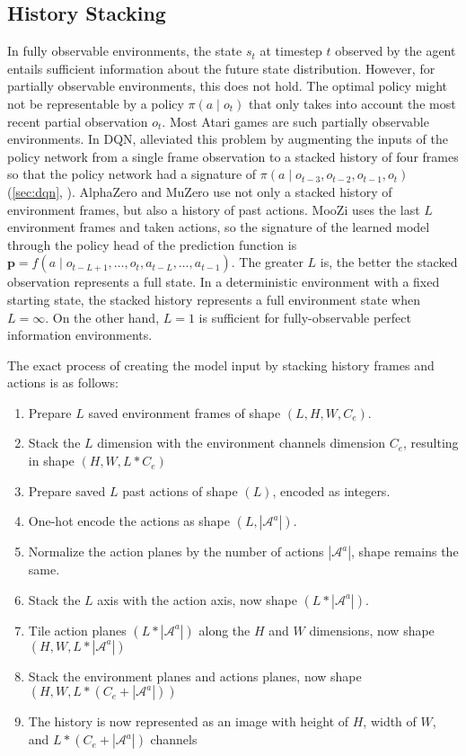 \subsection{History Stacking} \label{sec:history_stacking}
In fully observable environments, the state $s_t$ at timestep $t$ observed by the agent entails sufficient information about the future state distribution.
However, for partially observable environments, this does not hold.
The optimal policy might not be representable by a policy $\pi(a \mid o_t)$ that only takes into account the most recent partial observation $o_t$.
Most Atari games are such partially observable environments.
In DQN, \citeauthor{PlayingAtariDeep_Mnih.Kavukcuoglu.ea_2013} alleviated this problem by augmenting the inputs of the policy network from a single frame observation to a stacked history of four frames so that the policy network had a signature of $\pi(a \mid o_{t-3}, o_{t-2}, o_{t-1}, o_t)$ (\ref{sec:dqn}, \cite{PlayingAtariDeep_Mnih.Kavukcuoglu.ea_2013}).
AlphaZero and MuZero use not only a stacked history of environment frames, but also a history of past actions.
MooZi uses the last $L$ environment frames and taken actions, so the signature of the learned model through the policy head of the prediction function is $\mathbf{p} = f(a \mid o_{t - L + 1}, \dots, o_t, a_{t - L}, \dots, a_{t-1})$.
The greater $L$ is, the better the stacked observation represents a full state.
In a deterministic environment with a fixed starting state, the stacked history represents a full environment state when $L = \infty$.
On the other hand, $L = 1$ is sufficient for fully-observable perfect information environments.

The exact process of creating the model input by stacking history frames and actions is as follows:
\begin{enumerate}
    \item Prepare $L$ saved environment frames of shape $(L, H, W, C_e)$.
    \item Stack the $L$ dimension with the environment channels dimension $C_e$, resulting in shape $(H, W, L * C_e)$
    \item Prepare saved $L$ past actions of shape $(L)$, encoded as integers.
    \item One-hot encode the actions as shape $(L, |\mathcal{A}^a|)$.
    \item Normalize the action planes by the number of actions $|\mathcal{A}^a|$, shape remains the same.
    \item Stack the $L$ axis with the action axis, now shape $(L * |\mathcal{A}^a|)$.
    \item Tile action planes $(L * |\mathcal{A}^a|)$ along the $H$ and $W$ dimensions, now shape $(H, W, L * |\mathcal{A}^a|)$
    \item Stack the environment planes and actions planes, now shape $(H, W, L * (C_e + |\mathcal{A}^a|))$
    \item The history is now represented as an image with height of $H$, width of $W$, and $L * (C_e + |\mathcal{A}^a|)$ channels
\end{enumerate}

